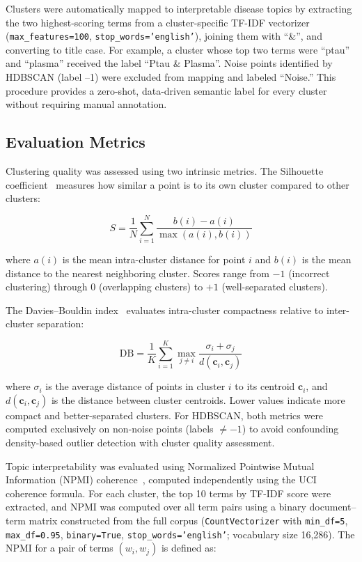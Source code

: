 \documentclass[a4paper,10pt,conference]{IEEEtran}
\begin{document}
Clusters were automatically mapped to interpretable disease topics by extracting the two highest-scoring terms from a cluster-specific TF-IDF vectorizer (\texttt{max\_features=100}, \texttt{stop\_words='english'}), joining them with ``\&'', and converting to title case. For example, a cluster whose top two terms were ``ptau'' and ``plasma'' received the label ``Ptau \& Plasma''. Noise points identified by HDBSCAN (label --1) were excluded from mapping and labeled ``Noise.'' This procedure provides a zero-shot, data-driven semantic label for every cluster without requiring manual annotation.

\subsection{Evaluation Metrics}

Clustering quality was assessed using two intrinsic metrics. The Silhouette coefficient~\cite{ref26} measures how similar a point is to its own cluster compared to other clusters:

\begin{equation}
S = \frac{1}{N} \sum_{i=1}^{N} \frac{b(i) - a(i)}{\max(a(i), b(i))}
\end{equation}

where $a(i)$ is the mean intra-cluster distance for point $i$ and $b(i)$ is the mean distance to the nearest neighboring cluster. Scores range from $-1$ (incorrect clustering) through $0$ (overlapping clusters) to $+1$ (well-separated clusters).

The Davies--Bouldin index~\cite{ref27} evaluates intra-cluster compactness relative to inter-cluster separation:

\begin{equation}
\text{DB} = \frac{1}{K} \sum_{i=1}^{K} \max_{j \neq i} \frac{\sigma_i + \sigma_j}{d(\mathbf{c}_i, \mathbf{c}_j)}
\end{equation}

where $\sigma_i$ is the average distance of points in cluster $i$ to its centroid $\mathbf{c}_i$, and $d(\mathbf{c}_i, \mathbf{c}_j)$ is the distance between cluster centroids. Lower values indicate more compact and better-separated clusters. For HDBSCAN, both metrics were computed exclusively on non-noise points (labels $\neq -1$) to avoid confounding density-based outlier detection with cluster quality assessment.

Topic interpretability was evaluated using Normalized Pointwise Mutual Information (NPMI) coherence~\cite{ref28}, computed independently using the UCI coherence formula. For each cluster, the top 10 terms by TF-IDF score were extracted, and NPMI was computed over all term pairs using a binary document--term matrix constructed from the full corpus (\texttt{CountVectorizer} with \texttt{min\_df=5}, \texttt{max\_df=0.95}, \texttt{binary=True}, \texttt{stop\_words='english'}; vocabulary size 16,286). The NPMI for a pair of terms $(w_i, w_j)$ is defined as:
\end{document}
